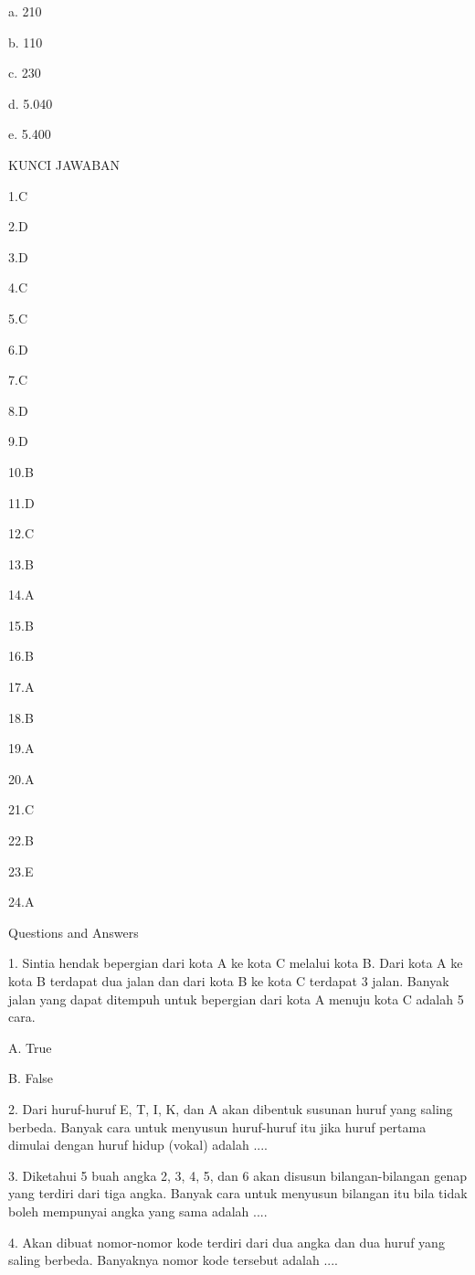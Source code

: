 \documentclass[11pt,fleqn]{book} %
\begin{document}
a.	210

b.	110

c.	230

d.	5.040

e.	5.400 


KUNCI JAWABAN

1.C

2.D

3.D

4.C

5.C

6.D

7.C

8.D

9.D

10.B

11.D

12.C

13.B

14.A

15.B

16.B

17.A

18.B

19.A

20.A

21.C

22.B

23.E

24.A





Questions and Answers




1. 
Sintia hendak bepergian dari kota A ke kota C melalui kota B. Dari kota A ke kota B terdapat dua jalan dan dari kota B ke kota C terdapat 3 jalan. Banyak jalan yang dapat ditempuh untuk bepergian dari kota A menuju kota C adalah 5 cara.

A. 
True

B. 
False

2. 
Dari huruf-huruf E, T, I, K, dan A akan dibentuk susunan huruf yang saling berbeda. Banyak cara untuk menyusun huruf-huruf itu jika huruf pertama dimulai dengan huruf hidup (vokal) adalah ....

3. 
Diketahui 5 buah angka 2, 3, 4, 5, dan 6 akan disusun bilangan-bilangan genap yang terdiri dari tiga angka. Banyak cara untuk menyusun bilangan itu bila tidak boleh mempunyai angka yang sama adalah ....

4. 
Akan dibuat nomor-nomor kode terdiri dari dua angka dan dua huruf yang saling berbeda. Banyaknya nomor kode tersebut adalah ....
\end{document}

